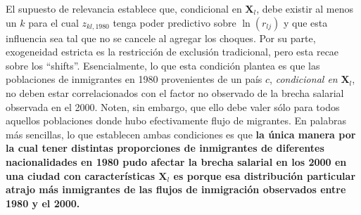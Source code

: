 \documentclass[a4paper, answers, addpoints, 11pt]{exam}
\begin{document}
El supuesto de relevancia establece que, condicional en $\boldsymbol{X}_l$, debe existir al menos un $k$ para el cual $z_{kl, 1980}$ tenga poder predictivo sobre $\ln(r_{lj})$ y que esta influencia sea tal que no se cancele al agregar los choques. Por su parte, exogeneidad estricta es la restricción de exclusión tradicional, pero esta recae sobre los ``shifts''. Esencialmente, lo que esta condición plantea es que las poblaciones de inmigrantes en 1980 provenientes de un país $c$, \textit{condicional en } $\boldsymbol{X}_l$, no deben estar correlacionados con el factor no observado de la brecha salarial observada en el 2000. Noten, sin embargo, que ello debe valer sólo para todos aquellos poblaciones donde hubo  efectivamente flujo de migrantes. En palabras más sencillas, lo que establecen ambas condiciones es que \textbf{la única manera por la cual tener distintas proporciones de inmigrantes de diferentes nacionalidades en 1980 pudo afectar la brecha salarial en los 2000 en una ciudad con características $\boldsymbol{X}_l$ es porque esa distribución particular atrajo más inmigrantes de las flujos de inmigración observados entre 1980 y el 2000.}
\end{document}
